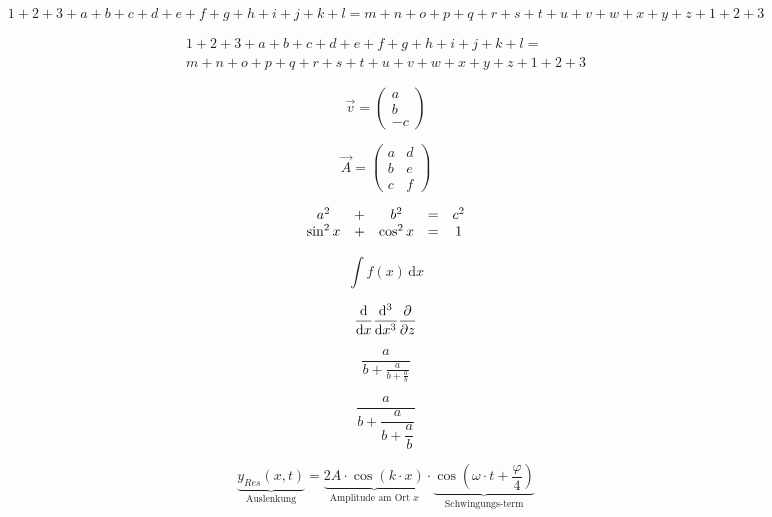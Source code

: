\documentclass[a4paper, ngerman, oneside, 10pt]{article}
\begin{document}
\begin{equation}
	1+2+3+a+b+c+d+e+f+g+h+i+j+k+l=m+n+o+p+q+r+s+t+u+v+w+x+y+z+1+2+3
\end{equation}

\begin{multline}
	1+2+3+a+b+c+d+e+f+g+h+i+j+k+l= \\
	m+n+o+p+q+r+s+t+u+v+w+x+y+z+1+2+3
\end{multline}

\begin{equation}
	\vec{v}=
	\begin{pmatrix}
		a \\ b \\ -c
	\end{pmatrix}
\end{equation}

\begin{equation}
	\vec{A}=
	\begin{pmatrix}
		a & d \\
		b & e \\
		c & f
	\end{pmatrix}
\end{equation}

\begin{equation}
	\begin{array}[t]{c c c c c}
		a^2      & + & b^2      & = & c^2 \\
		\sin^2 x & + & \cos^2 x & = & 1
	\end{array}
\end{equation}


\begin{equation}
	\int f(x)\,\text{d}x
\end{equation}

\begin{equation}
	\dv{x} \\
	\dv[3]{x} \\
	\pdv{z}
\end{equation}

\begin{equation}
	\frac{a}{b+\frac{a}{b+\frac{a}{b}}}
\end{equation}

\begin{equation}
	\dfrac{a}{b+\dfrac{a}{b+\dfrac{a}{b}}}
\end{equation}

\begin{equation}
	\boxed{
	\underbrace{y_{Res}(x,t)}_{\text{Auslenkung}} =
	\underbrace{2A \cdot \cos \left( k \cdot x \right)}_{\text{Amplitude am Ort } x} \cdot
	\underbrace{\cos \left( \omega \cdot t + \frac{\varphi}{4} \right)}_{\text{Schwingungs-term}}
	}
\end{equation}
\end{document}
